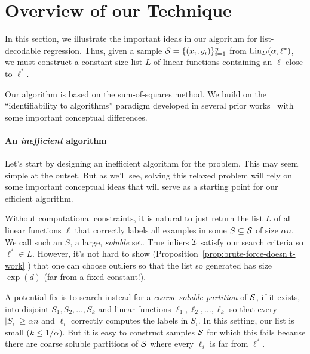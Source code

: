 



\section{Overview of our Technique} \label{sec:overview}
In this section, we illustrate the important ideas in our algorithm for list-decodable regression. 
Thus, given a sample $\mathcal S = \{(x_i,y_i)\}_{i = 1}^n$ from $\mathrm{Lin}_D(\alpha,\ell^*)$, we must construct a constant-size list $L$ of linear functions containing an $\ell$ close to $\ell^*$. 

Our algorithm is based on the sum-of-squares method. We build on the ``identifiability to algorithms'' paradigm developed in several prior works~\cite{DBLP:conf/colt/BarakM16,MR3388192-Barak15,DBLP:conf/focs/MaSS16,2017KS,HopkinsLi17,KothariSteinhardt17,DBLP:conf/colt/KlivansKM18} with some important conceptual differences. 

\paragraph{An \emph{inefficient} algorithm} Let's start by designing an inefficient algorithm for the problem. This may seem simple at the outset. But as we'll see, solving this relaxed problem will rely on some important conceptual ideas that will serve as a starting point for our efficient algorithm. 

Without computational constraints, it is natural to just return the list $L$ of all linear functions $\ell$ that correctly labels all examples in some $S \subseteq \mathcal S$ of size $\alpha n$. We call such an $S$, a large, \emph{soluble} set. True inliers $\mathcal I$ satisfy our search criteria so $\ell^* \in L$. However, it's not hard to show (Proposition~\ref{prop:brute-force-doesn't-work} ) that one can choose outliers so that the list so generated has size $\exp(d)$ (far from a fixed constant!).

A potential fix is to search instead for a \emph{coarse soluble partition} of $\mathcal S$, if it exists, into disjoint $S_1, S_2,\ldots, S_k$ and  linear functions $\ell_1, \ell_2, \ldots, \ell_k$ so that every $|S_i| \geq \alpha n$ and $\ell_i$ correctly computes the labels in $S_i$. In this setting, our list is small ($k\leq 1/\alpha$). But it is easy to construct samples $\mathcal S$ for which this fails 
because there are coarse soluble partitions of $\mathcal S$ where every $\ell_i$ is far from $\ell^*$. %
